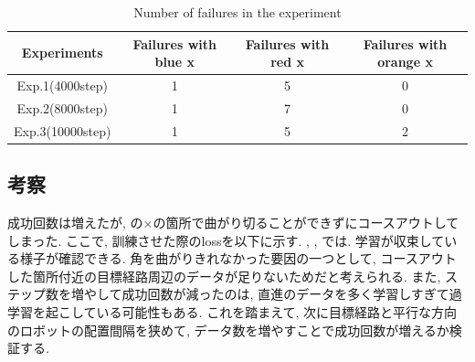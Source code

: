 \begin{table}[h]
  \centering
  \begin{tabular}{|c|c|c|c|} \hline
    Experiments & Failures with blue x & Failures with red x & Failures with orange x\\ \hline
    Exp.1(4000step) & 1 & 5 & 0 \\ \hline
    Exp.2(8000step) & 1 & 7 & 0 \\ \hline
    Exp.3(10000step) & 1 & 5 & 2 \\ \hline
  \end{tabular}
  \caption{Number of failures in the experiment}
  \label{tb:fail1.2}
\end{table}

\newpage
\subsection{考察}
成功回数は増えたが, の×の箇所で曲がり切ることができずにコースアウトしてしまった. ここで, 訓練させた際のlossを以下に示す. , , では. 学習が収束している様子が確認できる. 角を曲がりきれなかった要因の一つとして, コースアウトした箇所付近の目標経路周辺のデータが足りないためだと考えられる. また, ステップ数を増やして成功回数が減ったのは, 直進のデータを多く学習しすぎて過学習を起こしている可能性もある. これを踏まえて, 次に目標経路と平行な方向のロボットの配置間隔を狭めて, データ数を増やすことで成功回数が増えるか検証する. 


